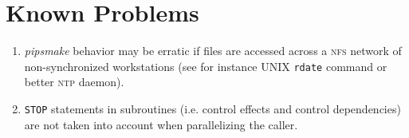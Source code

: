 \documentclass[a4paper]{report}
\begin{document}
\chapter{Known Problems}

\begin{enumerate}

\item {\em pipsmake} behavior may be erratic if files are accessed across
  a \textsc{nfs} network of non-synchronized workstations (see for
  instance UNIX \texttt{rdate} command or better \textsc{ntp} daemon).

\item \texttt{STOP} statements in subroutines (i.e. control effects and
control dependencies) are not taken into account when parallelizing the
caller.

\end{enumerate}



% 



\newpage


\printindex
\end{document}
